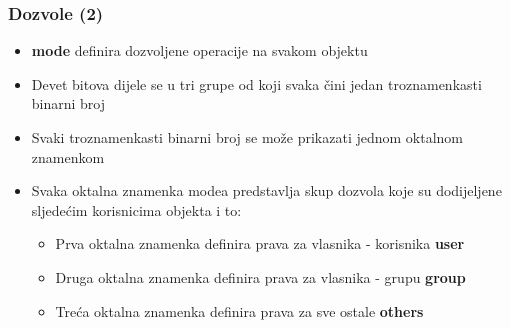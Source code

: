 \documentclass[table,usenames,dvipsnames]{beamer}
\begin{document}
\begin{frame}[t]
\frametitle{Dozvole (2)}
\begin{itemize}
  \item \textbf{mode} definira dozvoljene operacije na svakom objektu
  \vspace{1em}
  \item Devet bitova dijele se u tri grupe od koji svaka čini jedan troznamenkasti binarni broj
  \item Svaki troznamenkasti binarni broj se može prikazati jednom oktalnom znamenkom
\end{itemize}
\begin{itemize}
  \item Svaka oktalna znamenka modea predstavlja skup dozvola koje su dodijeljene sljedećim korisnicima objekta i to:
  \begin{itemize}
	\item Prva oktalna znamenka definira prava za vlasnika - korisnika \hfill \textbf{user}
    \item Druga oktalna znamenka definira prava za vlasnika - grupu \hfill \textbf{group}
    \item Treća oktalna znamenka definira prava za sve ostale \hfill \textbf{others}
  \end{itemize}
\end{itemize}
\end{frame}
\end{document}
